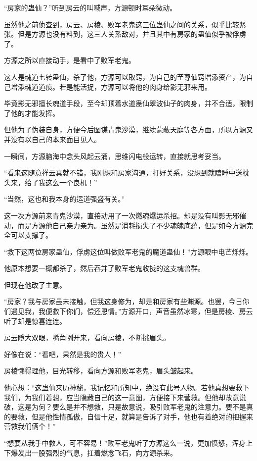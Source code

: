
\begin{this_body}

“房家的蛊仙？”听到房云的叫喊声，方源顿时耳朵微动。

虽然他之前侦查到，房云、房棱、败军老鬼这三位蛊仙之间的关系，似乎比较紧张。但是方源也没有料到，这三人关系敌对，并且其中有房家的蛊仙似乎被俘虏了。

方源之所以直接动手，是看中了败军老鬼。

这人是魂道七转蛊仙，杀了他，方源可以取窍，为自己的至尊仙窍增添资产，为自己增添魂道道痕。若是能活捉，方源可以将他的肉身给影无邪来用。

毕竟影无邪擅长魂道手段，至今却顶着水道蛊仙翠波仙子的肉身，并不合适，限制了他的才能发挥。

但他为了伪装自身，方便今后图谋青鬼沙漠，继续蒙蔽天庭等各方面，所以方源又并没有以自己的本来面目见人。

一瞬间，方源脑海中念头风起云涌，思维闪电般运转，直接就思考妥当。

“看来这随意祥云真就不错，我刚想和房家沟通，打好关系，没想到就瞌睡中送枕头来，给了我这么一个良机！”

“当然，这也和我本身的运道强盛有关。”

这一次方源前来青鬼沙漠，直接动用了一次燃魂爆运杀招。却是没有叫影无邪催动，而是方源他自己亲力亲为。虽然是消耗损失了不少魂魄底蕴，但是如今方源完全可以支撑了。

“救下这两位房家蛊仙，俘虏这位叫做败军老鬼的魔道蛊仙！”方源眼中电芒烁烁。

他原本想要一概都杀了，然后吞并了败军老鬼收拢的这支魂兽群。

但现在他改了主意。

“房家？我与房家虽未接触，但我这身修为，却是和房家有些渊源。也罢，今日你们遇见我，我便救下你们，偿还恩情。”方源开口，声音虽然冰寒，但是房棱、房云听了却是惊喜连连。

房云瞪大双眼，嘴角咧开来，看向房棱，不断挑眉头。

好像在说：“看吧，果然是我的贵人！”

房棱懒得理他，目光转移，看向方源和败军老鬼，眉头皱起来。

他心想：“这蛊仙来历神秘，我记忆和所知中，绝没有此号人物。若他真想要救下我们，为我们着想，应当隐藏自己的这一意图，方便接下来营救。但他却故意说破，这是为何？要么是并不想救，只是故意说，吸引败军老鬼的注意力。要不是真的要救，但是他性情孤傲，自信十足，就算是告诉了对手，他也有着绝对的把握来营救我们俩个！”

“想要从我手中救人，可不容易！”败军老鬼听了方源这么一说，更加愤怒，浑身上下爆发出一股强烈的气息，扛着燃念飞石，向方源杀来。


\end{this_body}
